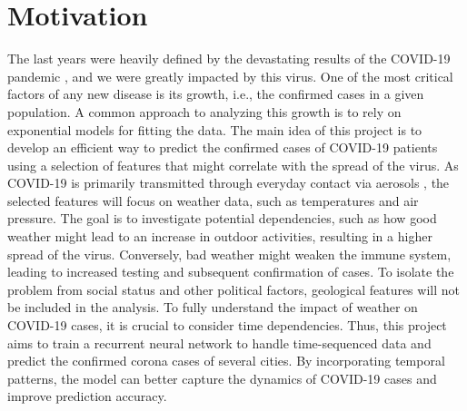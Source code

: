 \section{Motivation}
The last years were heavily defined by the devastating results of the COVID-19 pandemic \cite{covid}, and we were greatly impacted by this virus. One of the most critical factors of any new disease is its growth, i.e., the confirmed cases in a given population. A common approach to analyzing this growth is to rely on exponential models for fitting the data.
The main idea of this project is to develop an efficient way to predict the confirmed cases of COVID-19 patients using a selection of features that might correlate with the spread of the virus. As COVID-19 is primarily transmitted through everyday contact via aerosols \cite{covid}, the selected features will focus on weather data, such as temperatures and air pressure. The goal is to investigate potential dependencies, such as how good weather might lead to an increase in outdoor activities, resulting in a higher spread of the virus. Conversely, bad weather might weaken the immune system, leading to increased testing and subsequent confirmation of cases. To isolate the problem from social status and other political factors, geological features will not be included in the analysis.
To fully understand the impact of weather on COVID-19 cases, it is crucial to consider time dependencies. 
Thus, this project aims to train a recurrent neural network \cite{keras} to handle time-sequenced data and predict the confirmed corona cases of several cities. By incorporating temporal patterns, the model can better capture the dynamics of COVID-19 cases and improve prediction accuracy.
